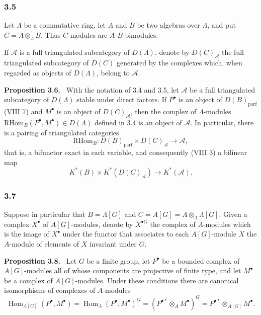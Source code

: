 \documentclass[11pt]{article}
\newenvironment{statement}[1]{\par\medskip\noindent\textbf{#1.}\ }{\par\medskip}
\DeclareMathOperator{\Hom}{Hom}
\providecommand{\RHom}{\mathrm{RHom}}
\providecommand{\parf}{\mathrm{parf}}
\providecommand{\RHom}{\mathrm{RHom}}
\providecommand{\Hom}{\operatorname{Hom}}
\providecommand{\RHom}{\mathrm R\mathcal{H}om}
\providecommand{\parf}{\mathrm{parf}}
\providecommand{\RHom}{\mathrm{RHom}}
\begin{document}
\subsubsection*{3.5}

Let $\Lambda$ be a commutative ring, let $A$ and $B$ be two algebras over $\Lambda$, and put $C=A\otimes_\Lambda B$. Thus $C$-modules are $A$-$B$-bimodules.

If $\mathcal A$ is a full triangulated subcategory of $D(\Lambda)$, denote by $D(C)_{\mathcal A}$ the full triangulated subcategory of $D(C)$ generated by the complexes which, when regarded as objects of $D(\Lambda)$, belong to $\mathcal A$.

\begin{statement}{Proposition 3.6}
With the notation of 3.4 and 3.5, let $\mathcal A$ be a full triangulated subcategory of $D(\Lambda)$ stable under direct factors. If $P^\bullet$ is an object of $D(B)_{\parf}$ (VIII 7) and $M^\bullet$ is an object of $D(C)_{\mathcal A}$, then the complex of $\Lambda$-modules $\RHom_B(P^\bullet,M^\bullet)\in D(\Lambda)$ defined in 3.4 is an object of $\mathcal A$. In particular, there is a pairing of triangulated categories
\[
\RHom_B:D(B)_{\parf}\times D(C)_{\mathcal A}\longrightarrow \mathcal A,
\tag{3.6.1}
\]
that is, a bifunctor exact in each variable, and consequently (VIII 3) a bilinear map
\[
K^*(B)\times K^*(D(C)_{\mathcal A})\longrightarrow K^*(\mathcal A).
\tag{3.6.2}
\]
\end{statement}

\subsubsection*{3.7}

Suppose in particular that $B=\Lambda[G]$ and $C=A[G]=A\otimes_\Lambda\Lambda[G]$. Given a complex $X^\bullet$ of $A[G]$-modules, denote by $X^{\bullet G}$ the complex of $A$-modules which is the image of $X^\bullet$ under the functor that associates to each $A[G]$-module $X$ the $A$-module of elements of $X$ invariant under $G$.

\begin{statement}{Proposition 3.8}
Let $G$ be a finite group, let $P^\bullet$ be a bounded complex of $A[G]$-modules all of whose components are projective of finite type, and let $M^\bullet$ be a complex of $A[G]$-modules. Under these conditions there are canonical isomorphisms of complexes of $A$-modules
\[
\Hom_{A[G]}(P^\bullet,M^\bullet)=\Hom_A(P^\bullet,M^\bullet)^G=(P^{\bullet *}\otimes_A M^\bullet)^G=P^{\bullet *}\otimes_{A[G]}M^\bullet.
\tag{3.8.1}
\]
\end{statement}
\end{document}
